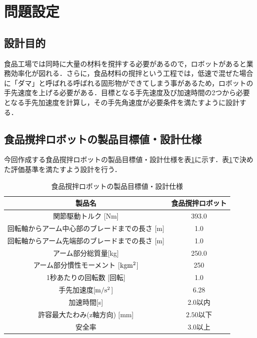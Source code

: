 \section{問題設定}\label{ux554fux984cux8a2dux5b9a}

\subsection{設計目的}\label{ux8a2dux8a08ux76eeux7684}

食品工場では同時に大量の材料を撹拌する必要があるので，ロボットがあると業務効率化が図れる．さらに，食品材料の撹拌という工程では，低速で混ぜた場合に「ダマ」と呼ばれる呼ばれる固形物ができてしまう事があるため，ロボットの手先速度を上げる必要がある．目標となる手先速度及び加速時間の2つから必要となる手先加速度を計算し，その手先角速度が必要条件を満たすように設計する．

\subsection{食品撹拌ロボットの製品目標値・設計仕様}\label{ux98dfux54c1ux64b9ux62ccux30edux30dcux30c3ux30c8ux306eux88fdux54c1ux76eeux6a19ux5024ux8a2dux8a08ux4ed5ux69d8}

今回作成する食品撹拌ロボットの製品目標値・設計仕様を表\ref{first-spec}に示す．表\ref{first-spec}で決めた評価基準を満たすよう設計を行う．

\begin{table}[htb]
\caption[]{食品撹拌ロボットの製品目標値・設計仕様}
  \begin{center}
    \begin{tabular}{|c|c|} \hline
      製品名 & 食品撹拌ロボット \\ \hline \hline
      関節駆動トルク [Nm] & 393.0 \\ \hline
      回転軸からアーム中心部のブレードまでの長さ [m] & 1.0  \\ \hline
      回転軸からアーム先端部のブレードまでの長さ [m] & 1.0  \\ \hline
      アーム部分総質量[kg] & 250.0  \\ \hline
      アーム部分慣性モーメント [$\rm kgm^2$] & 250 \\ \hline
      1秒あたりの回転数 [回転] & 1.0  \\ \hline
      手先加速度[$\rm m/s^2$] & 6.28 \\ \hline
      加速時間[s] & 2.0以内 \\ \hline
      許容最大たわみ(z軸方向) [mm]& $2.50$以下 \\ \hline
      安全率 & 3.0以上 \\ \hline
    \end{tabular}
    \label{first-spec}
  \end{center}
\end{table}

